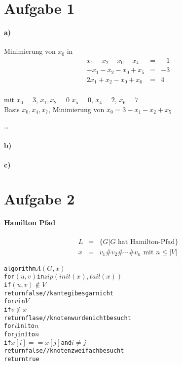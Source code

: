 




\newcommand{\nr}{11}



\section*{Aufgabe 1}
\paragraph{a)}

Minimierung von $x_0$ in
\begin{eqnarray}
  x_1 - x_2 - x_0 + x_4 &=& -1 \\
 -x_1 - x_2 - x_0 + x_5 &=& -3 \\
 2x_1 + x_2 - x_0 + x_6 &=& 4 \\
\end{eqnarray}

mit $x_0 = 3$, $x_1,x_2=0$ \tf $x_5=0$, $x_4=2$, $x_6=7$
\\Basis $x_0, x_4, x_7$, Minimierung von $x_0 = 3 - x_1 -x_2 + x_5$

\ldots

\paragraph{b)}
\paragraph{c)}

\section*{Aufgabe 2}

\paragraph{Hamilton Pfad}
\begin{eqnarray}
L &=& \{G | \text{$G$ hat Hamilton-Pfad} \} \\
x &=& v_1 \# v_2 \# \cdots \# v_n \text{ mit $n \leq |V|$}
\end{eqnarray}

\begin{alltt}
algorithm \(A(G,x)\)
    for \((u,v)\) in \(zip(init(x), tail(x))\)
      if \((u,v) \notin V\)
        return false // kante gib es gar nicht
    for \(v\) in \(V\)
      if \(v \notin x\)
        return flase // knoten wurde nicht besucht
    for \(i\) in \(1\) to \(n\)
      for \(j\) in \(1\) to \(n\)
        if \(x[i] == x[j]\) and \(i \neq j\)
          return false // knoten zweifach besucht
    return true
\end{alltt}

